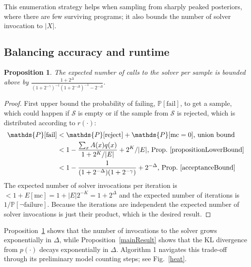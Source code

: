 \documentclass{article}
\newcommand{\Probability}{\mathds{P}} %
\newtheorem{proposition}{Proposition}
\begin{document}
  This enumeration strategy helps when sampling from sharply peaked posteriors,
  where there are few surviving programs; it also bounds the number of solver invocation to $|X|$.


  \subsection{Balancing accuracy and runtime}\label{efficiencyAnalysis}

  \begin{proposition}\label{proposition:tt}
    The expected number of calls to the solver per sample is bounded above by $\frac{1 + 2^\Delta}{(1 + 2^{ - \gamma})^{-1}(1 + 2^{ - \Delta})^{-1} - 2^{ - \Delta}}.$
  \end{proposition}
  \begin{proof}
    First upper bound the probability of failing, $\Probability [\text{fail}]$, to get a sample,
    which could happen if $\mathcal{S}$  is empty or if the sample from $\mathcal{S}$ is rejected,
    which is distributed according to $r(\cdot )$:
    \begin{align}
      \Probability [\text{fail}]& < \Probability [\text{reject}] + \Probability [\text{mc} = 0] \text{, union bound}\\
      & < 1 - \frac{\sum_x A(x)q(x)}{1 + 2^K/|E|} + 2^K/|E| \text{, Prop.~\ref{propositionLowerBound}}\\
      & < 1 - \frac{1}{(1 + 2^{ - \Delta})(1 + 2^{ - \gamma})} + 2^{ - \Delta}\text{, Prop.~\ref{acceptanceBound}}
    \end{align}
    The expected number of solver invocations per iteration is $< 1+E[\text{mc}] = 1 + |E|2^{-K} = 1 + 2^{\Delta}$
    and the expected number of iterations is $1/\Probability [\neg\text{failure}] $.
    Because the iterations are independent the expected number of solver invocations is just their product, which is the desired result.
  \end{proof}

  Proposition~\ref{proposition:tt} shows that the number of invocations to the solver grows exponentially in $\Delta$, while Proposition~\ref{mainResult} shows that the KL divergence from $p(\cdot )$ decays exponentially in $\Delta$.
  Algorithm 1 navigates this trade-off through its preliminary model counting steps; see Fig.~\ref{heat}.
  
\end{document}
